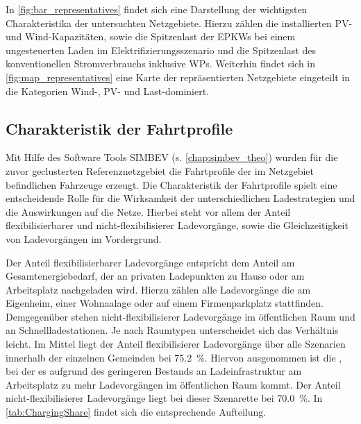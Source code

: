 

In \autoref{fig:bar_representatives} findet sich eine Darstellung der wichtigsten Charakteristika der untersuchten Netzgebiete.
Hierzu zählen die installierten \gls{PV}- und Wind-Kapazitäten, sowie die Spitzenlast der \glspl{EPKW} bei einem ungesteuerten Laden im Elektrifizierungsszenario und die Spitzenlast des konventionellen Stromverbrauchs inklusive \glspl{WP}.
Weiterhin findet sich in \autoref{fig:map_representatives} eine Karte der repräsentierten Netzgebiete eingeteilt in die Kategorien Wind-, \gls{PV}- und Last-dominiert.







\subsection{Charakteristik der Fahrtprofile}



Mit Hilfe des Software Tools \gls{SIMBEV} (s. \autoref{chap:simbev_theo}) wurden für die zuvor geclusterten Referenznetzgebiet die Fahrtprofile der im Netzgebiet befindlichen Fahrzeuge erzeugt.
Die Charakteristik der Fahrtprofile spielt eine entscheidende Rolle für die Wirksamkeit der unterschiedlichen Ladestrategien und die Auswirkungen auf die Netze.
Hierbei steht vor allem der Anteil flexibilisierbarer und nicht-flexibilisierer Ladevorgänge, sowie die Gleichzeitigkeit von Ladevorgängen im Vordergrund.\medskip

Der Anteil flexibilisierbarer Ladevorgänge entspricht dem Anteil am Gesamtenergiebedarf, der an privaten Ladepunkten zu Hause oder am Arbeitsplatz nachgeladen wird.
Hierzu zählen alle Ladevorgänge die am Eigenheim, einer Wohnaalage oder auf einem Firmenparkplatz stattfinden.
Demgegenüber stehen nicht-flexibilisierer Ladevorgänge im öffentlichen Raum und an Schnellladestationen.
Je nach Raumtypen unterscheidet sich das Verhältnis leicht.
Im Mittel liegt der Anteil flexibilisierer Ladevorgänge über alle Szenarien innerhalb der einzelnen Gemeinden bei \SI{75.2}{\percent}.
Hiervon ausgenommen ist die \SzeFirmenparkplatzdot, bei der es aufgrund des geringeren Bestands an Ladeinfrastruktur am Arbeitsplatz zu mehr Ladevorgängen im öffentlichen Raum kommt.
Der Anteil nicht-flexibilisierer Ladevorgänge liegt bei dieser Szenarette bei \SI{70.0}{\percent}.
In \autoref{tab:ChargingShare} findet sich die entsprechende Aufteilung.

